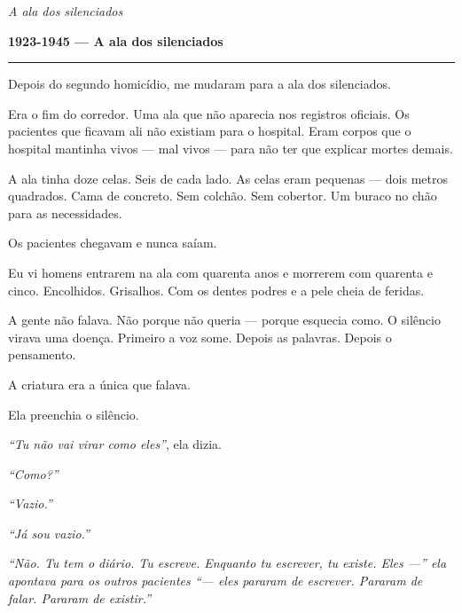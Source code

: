 
\noindent \textit{A ala dos silenciados}

\noindent \textbf{1923-1945 --- A ala dos silenciados}

\vspace{0.5em}\noindent\rule{\textwidth}{0.5pt}\vspace{0.5em}

\noindent Depois do segundo homicídio, me mudaram para a ala dos silenciados.

\noindent Era o fim do corredor. Uma ala que não aparecia nos registros oficiais. Os pacientes que ficavam ali não existiam para o hospital. Eram corpos que o hospital mantinha vivos --- mal vivos --- para não ter que explicar mortes demais.

\noindent A ala tinha doze celas. Seis de cada lado. As celas eram pequenas --- dois metros quadrados. Cama de concreto. Sem colchão. Sem cobertor. Um buraco no chão para as necessidades.

\noindent Os pacientes chegavam e nunca saíam.

\noindent Eu vi homens entrarem na ala com quarenta anos e morrerem com quarenta e cinco. Encolhidos. Grisalhos. Com os dentes podres e a pele cheia de feridas.

\noindent A gente não falava. Não porque não queria --- porque esquecia como. O silêncio virava uma doença. Primeiro a voz some. Depois as palavras. Depois o pensamento.

\noindent A criatura era a única que falava.

\noindent Ela preenchia o silêncio.

\noindent \textit{\textquotedblleft{}Tu não vai virar como eles\textquotedblright{}}, ela dizia.

\noindent \textit{\textquotedblleft{}Como?\textquotedblright{}}

\noindent \textit{\textquotedblleft{}Vazio.\textquotedblright{}}

\noindent \textit{\textquotedblleft{}Já sou vazio.\textquotedblright{}}

\noindent \textit{\textquotedblleft{}Não. Tu tem o diário. Tu escreve. Enquanto tu escrever, tu existe. Eles ---\textquotedblright{}\textit{ ela apontava para os outros pacientes }\textquotedblleft{}--- eles pararam de escrever. Pararam de falar. Pararam de existir.\textquotedblright{}}


